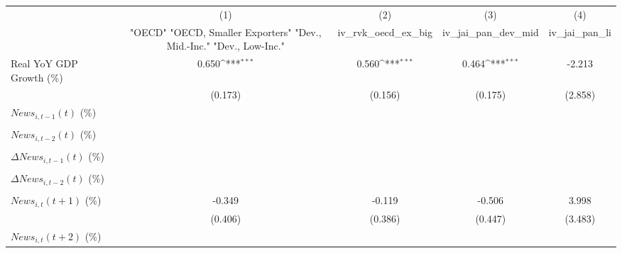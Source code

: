 {
\def\sym#1{\ifmmode^{#1}\else\(^{#1}\)\fi}
\begin{tabular}{l*{4}{c}}
\toprule
                    &\multicolumn{1}{c}{(1)}&\multicolumn{1}{c}{(2)}&\multicolumn{1}{c}{(3)}&\multicolumn{1}{c}{(4)}\\
                    &\multicolumn{1}{c}{ "OECD" "OECD, Smaller Exporters" "Dev., Mid.-Inc." "Dev., Low-Inc."}&\multicolumn{1}{c}{iv_rvk_oecd_ex_big}&\multicolumn{1}{c}{iv_jai_pan_dev_mid}&\multicolumn{1}{c}{iv_jai_pan_li}\\
\midrule
Real YoY GDP Growth (\%)&       0.650\sym{***}&       0.560\sym{***}&       0.464\sym{***}&      -2.213         \\
                    &     (0.173)         &     (0.156)         &     (0.175)         &     (2.858)         \\
\addlinespace
$ News_{i,t-1}(t)$ (\%)&                     &                     &                     &                     \\
                    &                     &                     &                     &                     \\
\addlinespace
$ News_{i,t-2}(t)$ (\%)&                     &                     &                     &                     \\
                    &                     &                     &                     &                     \\
\addlinespace
$ \Delta News_{i,t-1}(t)$ (\%)&                     &                     &                     &                     \\
                    &                     &                     &                     &                     \\
\addlinespace
$ \Delta News_{i,t-2}(t)$ (\%)&                     &                     &                     &                     \\
                    &                     &                     &                     &                     \\
\addlinespace
$ News_{i,t}(t+1)$ (\%)&      -0.349         &      -0.119         &      -0.506         &       3.998         \\
                    &     (0.406)         &     (0.386)         &     (0.447)         &     (3.483)         \\
\addlinespace
$ News_{i,t}(t+2)$ (\%)&                     &                     &                     &                     \\

\end{tabular}}
